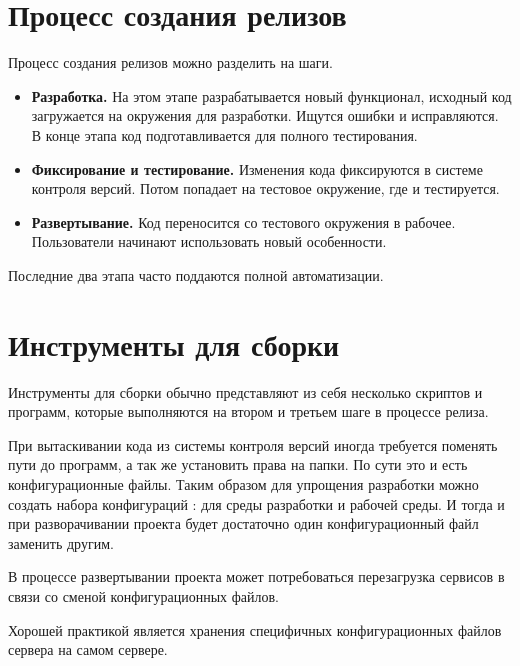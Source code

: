 
\section{ Процесс создания релизов } \label{sect3_10}

Процесс создания релизов можно разделить на шаги.

\begin{itemize}

\item \textbf{Разработка.} На этом этапе разрабатывается новый функционал, исходный код загружается на окружения для разработки. Ищутся ошибки и исправляются. В конце этапа код подготавливается для полного тестирования.

\item \textbf{Фиксирование и тестирование.}  Изменения кода фиксируются в системе контроля версий. Потом попадает на тестовое окружение, где и тестируется.

\item \textbf{ Развертывание.} Код переносится со тестового окружения в рабочее. Пользователи начинают использовать новый особенности. 

\end{itemize}

Последние два этапа часто поддаются полной автоматизации.

\section{ Инструменты для сборки } \label{sect3_11}

Инструменты для сборки обычно представляют из себя несколько скриптов и программ, которые выполняются на втором и третьем шаге в процессе релиза.


При вытаскивании кода из системы контроля версий иногда требуется поменять пути до программ, а так же установить права на папки. По сути это и есть конфигурационные файлы. Таким образом для упрощения разработки можно создать  набора конфигураций : для среды разработки и рабочей среды.  И тогда и при разворачивании проекта будет достаточно один конфигурационный файл заменить другим.


В процессе развертывании проекта может потребоваться перезагрузка сервисов в связи со сменой конфигурационных файлов.

Хорошей практикой является хранения специфичных конфигурационных файлов сервера на самом сервере.

